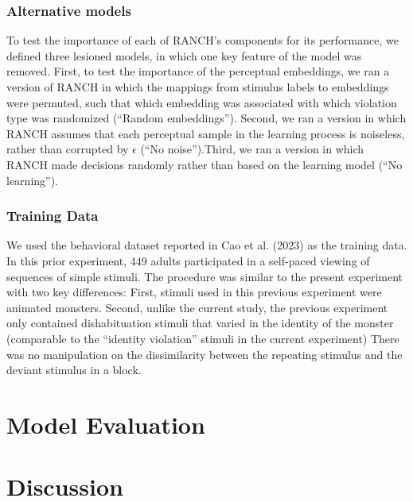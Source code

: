 \documentclass[10pt, letterpaper]{article}
\begin{document}
\hypertarget{alternative-models}{%
\subsubsection{Alternative models}\label{alternative-models}}

To test the importance of each of RANCH's components for its
performance, we defined three lesioned models, in which one key feature
of the model was removed. First, to test the importance of the
perceptual embeddings, we ran a version of RANCH in which the mappings
from stimulus labels to embeddings were permuted, such that which
embedding was associated with which violation type was randomized
(``Random embeddings''). Second, we ran a version in which RANCH assumes
that each perceptual sample in the learning process is noiseless, rather
than corrupted by \(\epsilon\) (``No noise'').Third, we ran a version in
which RANCH made decisions randomly rather than based on the learning
model (``No learning'').

\hypertarget{training-data}{%
\subsubsection{Training Data}\label{training-data}}

We used the behavioral dataset reported in Cao et al. (2023) as the
training data. In this prior experiment, 449 adults participated in a
self-paced viewing of sequences of simple stimuli. The procedure was
similar to the present experiment with two key differences: First,
stimuli used in this previous experiment were animated monsters. Second,
unlike the current study, the previous experiment only contained
dishabituation stimuli that varied in the identity of the monster
(comparable to the ``identity violation'' stimuli in the current
experiment) There was no manipulation on the dissimilarity between the
repeating stimulus and the deviant stimulus in a block.

\hypertarget{model-evaluation}{%
\section{Model Evaluation}\label{model-evaluation}}

\hypertarget{discussion}{%
\section{Discussion}\label{discussion}}
\end{document}
